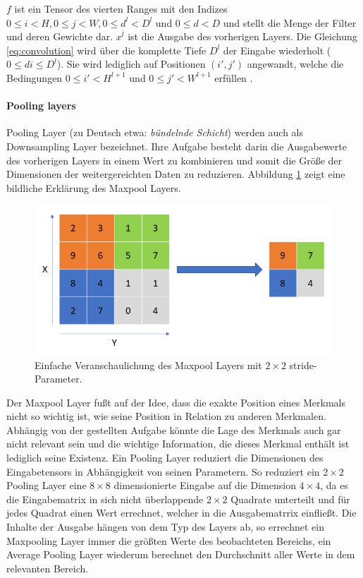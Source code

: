 $f$ ist ein Tensor des vierten Ranges mit den Indizes $ 0 \leq i < H,0 \leq j < W, 0 \leq d^l < D^l$ und $0 \leq d < D$ und stellt die Menge der Filter und deren Gewichte dar. $x^l$ ist die Ausgabe des vorherigen Layers. Die Gleichung \ref{eq:convolution} wird \"uber die komplette Tiefe $D^l$ der Eingabe wiederholt ($0 \leq di \leq D^l$). Sie wird lediglich auf Positionen $(i',j')$ angewandt, welche die Bedingungen $0 \leq i' < H^{l + 1}$ und $0 \leq j' < W^{l + 1}$ erfüllen \parencite{Wu.2017}.

\paragraph{Pooling layers}

Pooling Layer (zu Deutsch etwa: \textit{bündelnde Schicht}) werden auch als Downsampling Layer bezeichnet. Ihre Aufgabe besteht darin die Ausgabewerte des vorherigen Layers in einem Wert zu kombinieren und somit die Größe der Dimensionen der weitergereichten Daten zu reduzieren. Abbildung \ref{fig:maxpool} zeigt eine bildliche Erklärung des Maxpool Layers.

\begin{figure}[H]
\centering
\includegraphics[scale=0.45]{pictures/grafiken/grafikenmax}
\caption[Caption for LOF]{Einfache Veranschaulichung des Maxpool Layers mit $2 \times 2$ stride-Parameter.}
\label{fig:maxpool}

\end{figure}

Der Maxpool Layer fußt auf der Idee, dass die exakte Position eines Merkmals nicht so wichtig ist, wie seine Position in Relation zu anderen Merkmalen. Abhängig von der gestellten Aufgabe könnte die Lage des Merkmals auch gar nicht relevant sein und die wichtige Information, die dieses Merkmal enthält ist lediglich seine Existenz. Ein Pooling Layer reduziert die Dimensionen des Eingabetensors in Abhängigkeit von seinen Parametern. So reduziert ein $2\times 2$ Pooling Layer eine $8\times8$ dimensionierte Eingabe auf die Dimension $4\times4$, da es die Eingabematrix in sich nicht überlappende $2\times2$ Quadrate unterteilt und f\"ur jedes Quadrat einen Wert errechnet, welcher in die Ausgabematrrix einflie\ss{}t. Die Inhalte der Ausgabe hängen von dem Typ des Layers ab, so errechnet ein Maxpooling Layer immer die größten Werte des beobachteten Bereichs, ein Average Pooling Layer wiederum berechnet den Durchschnitt aller Werte in dem relevanten Bereich.

